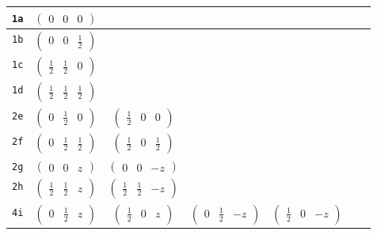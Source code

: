 \documentclass[fleqn,9pt,landscape]{jsarticle}
\begin{document}
\begin{center}
\begin{longtable}{ccccccc}
{\tt 1a} & $ \begin{pmatrix} 0 & 0 & 0 \end{pmatrix} $ & $  $ & $  $ & $  $ & $  $ & $  $ \\ \hline
{\tt 1b} & $ \begin{pmatrix} 0 & 0 & \frac{1}{2} \end{pmatrix} $ & $  $ & $  $ & $  $ & $  $ & $  $ \\ \hline
{\tt 1c} & $ \begin{pmatrix} \frac{1}{2} & \frac{1}{2} & 0 \end{pmatrix} $ & $  $ & $  $ & $  $ & $  $ & $  $ \\ \hline
{\tt 1d} & $ \begin{pmatrix} \frac{1}{2} & \frac{1}{2} & \frac{1}{2} \end{pmatrix} $ & $  $ & $  $ & $  $ & $  $ & $  $ \\ \hline
{\tt 2e} & $ \begin{pmatrix} 0 & \frac{1}{2} & 0 \end{pmatrix} $ & $ \begin{pmatrix} \frac{1}{2} & 0 & 0 \end{pmatrix} $ & $  $ & $  $ & $  $ & $  $ \\ \hline
{\tt 2f} & $ \begin{pmatrix} 0 & \frac{1}{2} & \frac{1}{2} \end{pmatrix} $ & $ \begin{pmatrix} \frac{1}{2} & 0 & \frac{1}{2} \end{pmatrix} $ & $  $ & $  $ & $  $ & $  $ \\ \hline
{\tt 2g} & $ \begin{pmatrix} 0 & 0 & z \end{pmatrix} $ & $ \begin{pmatrix} 0 & 0 & - z \end{pmatrix} $ & $  $ & $  $ & $  $ & $  $ \\ \hline
{\tt 2h} & $ \begin{pmatrix} \frac{1}{2} & \frac{1}{2} & z \end{pmatrix} $ & $ \begin{pmatrix} \frac{1}{2} & \frac{1}{2} & - z \end{pmatrix} $ & $  $ & $  $ & $  $ & $  $ \\ \hline
{\tt 4i} & $ \begin{pmatrix} 0 & \frac{1}{2} & z \end{pmatrix} $ & $ \begin{pmatrix} \frac{1}{2} & 0 & z \end{pmatrix} $ & $ \begin{pmatrix} 0 & \frac{1}{2} & - z \end{pmatrix} $ & $ \begin{pmatrix} \frac{1}{2} & 0 & - z \end{pmatrix} $ & $  $ & $  $ \\ \hline

\end{longtable}
\end{center}
\end{document}
